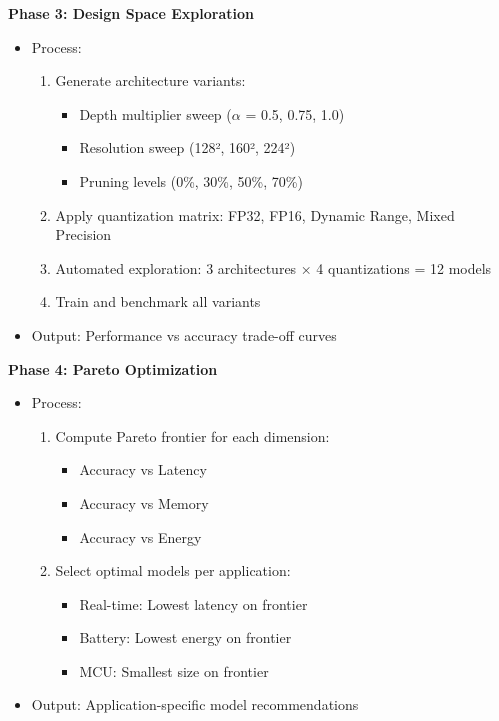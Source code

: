 \documentclass[10pt, a4paper]{article}
\begin{document}
\textbf{Phase 3: Design Space Exploration}
\begin{itemize}
    \item Process:
    \begin{enumerate}
        \item Generate architecture variants:
        \begin{itemize}
            \item Depth multiplier sweep ($\alpha$ = 0.5, 0.75, 1.0)
            \item Resolution sweep (128², 160², 224²)
            \item Pruning levels (0\%, 30\%, 50\%, 70\%)
        \end{itemize}
        \item Apply quantization matrix: FP32, FP16, Dynamic Range, Mixed Precision
        \item Automated exploration: 3 architectures × 4 quantizations = 12 models
        \item Train and benchmark all variants
    \end{enumerate}
    \item Output: Performance vs accuracy trade-off curves
\end{itemize}

\textbf{Phase 4: Pareto Optimization}
\begin{itemize}
    \item Process:
    \begin{enumerate}
        \item Compute Pareto frontier for each dimension:
        \begin{itemize}
            \item Accuracy vs Latency
            \item Accuracy vs Memory
            \item Accuracy vs Energy
        \end{itemize}
        \item Select optimal models per application:
        \begin{itemize}
            \item Real-time: Lowest latency on frontier
            \item Battery: Lowest energy on frontier
            \item MCU: Smallest size on frontier
        \end{itemize}
    \end{enumerate}
    \item Output: Application-specific model recommendations
\end{itemize}
\end{document}
